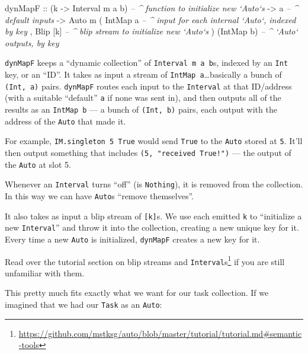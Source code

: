 \documentclass[]{article}
\newenvironment{Shaded}{}{}
\newcommand{\CommentTok}[1]{\textcolor[rgb]{0.38,0.63,0.69}{\textit{#1}}}
\newcommand{\DataTypeTok}[1]{\textcolor[rgb]{0.56,0.13,0.00}{#1}}
\newcommand{\NormalTok}[1]{#1}
\newcommand{\OtherTok}[1]{\textcolor[rgb]{0.00,0.44,0.13}{#1}}
\renewcommand{\href}[2]{#2\footnote{\url{#1}}}
\begin{document}
\begin{Shaded}
\begin{Highlighting}[]
\OtherTok{dynMapF ::}\NormalTok{ (k }\OtherTok{->} \DataTypeTok{Interval}\NormalTok{ m a b)    }\CommentTok{-- ^ function to initialize new `Auto`s}
        \OtherTok{->}\NormalTok{ a                        }\CommentTok{-- ^ default inputs}
        \OtherTok{->} \DataTypeTok{Auto}\NormalTok{ m ( }\DataTypeTok{IntMap}\NormalTok{ a        }\CommentTok{-- ^ input for each internal `Auto`, indexed by key}
\NormalTok{                  , }\DataTypeTok{Blip}\NormalTok{ [k]        }\CommentTok{-- ^ blip stream to initialize new `Auto`s}
\NormalTok{                  )}
\NormalTok{                  (}\DataTypeTok{IntMap}\NormalTok{ b)        }\CommentTok{-- ^ `Auto` outputs, by key}
\end{Highlighting}
\end{Shaded}

\texttt{dynMapF} keeps a ``dynamic collection'' of \texttt{Interval\ m\ a\ b}s,
indexed by an \texttt{Int} key, or an ``ID''. It takes as input a stream of
\texttt{IntMap\ a}\ldots{}basically a bunch of \texttt{(Int,\ a)} pairs.
\texttt{dynMapF} routes each input to the \texttt{Interval} at that ID/address
(with a suitable ``default'' \texttt{a} if none was sent in), and then outputs
all of the results as an \texttt{IntMap\ b} --- a bunch of \texttt{(Int,\ b)}
pairs, each output with the address of the \texttt{Auto} that made it.

For example, \texttt{IM.singleton\ 5\ True} would send \texttt{True} to the
\texttt{Auto} stored at \texttt{5}. It'll then output something that includes
\texttt{(5,\ "received\ True!")} --- the output of the \texttt{Auto} at slot 5.

Whenever an \texttt{Interval} turns ``off'' (is \texttt{Nothing}), it is removed
from the collection. In this way we can have \texttt{Auto}s ``remove
themselves''.

It also takes as input a blip stream of \texttt{{[}k{]}}s. We use each emitted
\texttt{k} to ``initialize a new \texttt{Interval}'' and throw it into the
collection, creating a new unique key for it. Every time a new \texttt{Auto} is
initialized, \texttt{dynMapF} creates a new key for it.

Read over the
\href{https://github.com/mstksg/auto/blob/master/tutorial/tutorial.md\#semantic-tools}{tutorial
section on blip streams and \texttt{Interval}s} if you are still unfamiliar with
them.

This pretty much fits exactly what we want for our task collection. If we
imagined that we had our \texttt{Task} as an \texttt{Auto}:
\end{document}
